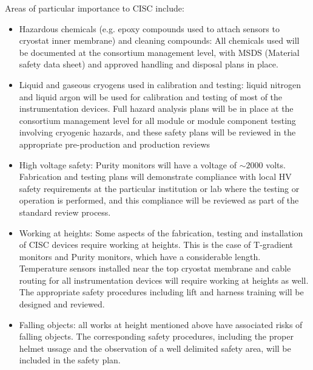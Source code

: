 Areas of particular importance to CISC include:
\begin{itemize}
\item Hazardous chemicals (e.g. epoxy compounds used to attach sensors to cryostat inner membrane) and cleaning compounds:
  All chemicals used will be documented at the consortium management level, with MSDS (Material safety data sheet) and approved handling and disposal plans in place.

\item Liquid and gaseous cryogens used in calibration and testing: liquid nitrogen and liquid argon will be used for calibration and testing of most of the instrumentation devices.
  Full hazard analysis plans will be in place at the consortium management level for all module or
  module component testing involving cryogenic hazards, and these safety plans will be reviewed in the appropriate pre-production and production reviews

\item High voltage safety:  Purity monitors will have a voltage of $\sim 2000$ volts. Fabrication and testing plans will demonstrate compliance with local
  HV safety requirements at the particular institution or lab where the testing or operation is performed, and this compliance will be reviewed as part of the standard review process.


\item Working at heights: Some aspects of the fabrication, testing and installation of CISC devices require working at heights. This is the 
  case of T-gradient monitors and Purity monitors, which have a considerable length. Temperature sensors installed near the top cryostat membrane and cable routing for all instrumentation devices
  will require working at heights as well. The appropriate safety procedures including lift and harness training will be designed and reviewed. 
  
\item Falling objects: all works at height mentioned above have associated risks of falling objects. The corresponding safety procedures, including the proper helmet ussage 
  and the observation of a well delimited safety area, will be included in the safety plan. 
\end{itemize}
  

  

